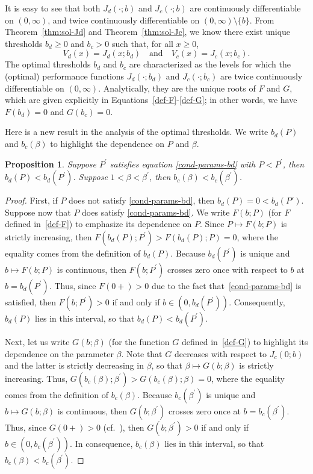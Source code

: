\documentclass[11pt,reqno]{amsart}
\newtheorem{proposition}[theorem]{Proposition}
\renewcommand{\geq}{\geqslant}
\begin{document}
It is easy to see that both $J_d(\cdot;b)$ and $J_c(\cdot;b)$ are continuously differentiable on $(0,\infty)$, and twice continuously differentiable on $(0,\infty) \setminus \{b\}$. From Theorem~\ref{thm:sol-Jd} and Theorem~\ref{thm:sol-Jc}, we know there exist unique thresholds $b_d\geq 0$ and $b_c > 0$ such that, for all $x\geq 0$,
\[
V_d(x) = J_d(x;b_d) \quad \text{and} \quad V_c(x) = J_c(x;b_c) .
\]
The optimal thresholds $b_d$ and $b_c$ are characterized as the levels for which the (optimal) performance functions $J_d (\cdot;b_d)$ and $J_c (\cdot;b_c)$ are twice continuously differentiable on $(0,\infty)$. Analytically, they are the unique roots of $F$ and $G$, which are given explicitly in Equations~\eqref{def-F}-\eqref{def-G}; in other words, we have $F(b_d) = 0$ and $G(b_c)=0$.

Here is a new result in the analysis of the optimal thresholds. We write $b_d(P)$ and $b_c(\beta)$ to highlight the dependence on $P$ and $\beta$.
\begin{proposition}\label{prop:seuils-croiss}
    Suppose  $P^\prime$ satisfies equation \eqref{cond-params-bd} with $P<P^\prime$, then $b_d(P)<b_d(P^\prime)$. Suppose $1< \beta < \beta^\prime$, then $b_c(\beta)<b_c(\beta^\prime)$.
\end{proposition}
\begin{proof}
    First, if $P$ does not satisfy \eqref{cond-params-bd}, then $b_d(P) = 0 < b_d(P')$. Suppose now that $P$ does satisfy \eqref{cond-params-bd}. We write $F(b;P)$ (for $F$ defined in~\eqref{def-F}) to emphasize its dependence on $P$. Since $P \mapsto F(b;P)$ is strictly increasing, then $F(b_d(P);P^\prime) > F(b_d(P);P) = 0$, where the equality comes from the definition of $b_d(P)$. Because $b_d(P^\prime)$ is unique and $b \mapsto F(b;P)$ is continuous, then $F(b;P^\prime)$ crosses zero once with respect to $b$ at $b = b_d(P^\prime)$. Thus, since $F(0+)>0$ due to the fact that~\eqref{cond-params-bd} is satisfied, then $F(b;P^\prime) > 0$ if and only if $b\in (0,b_d(P^\prime))$. Consequently, $b_d(P)$ lies in this interval, so that $b_d(P) < b_d(P^\prime)$.
        
    Next, let us write $G(b;\beta)$ (for the function $G$ defined in~\eqref{def-G}) to highlight its dependence on the parameter $\beta$. Note that $G$ decreases with respect to $J_c(0;b)$ and the latter is strictly decreasing in $\beta$, so that $\beta \mapsto G(b;\beta)$ is strictly increasing. Thus, $G(b_c(\beta);\beta^\prime) > G(b_c(\beta);\beta) = 0$, where the equality comes from the definition of $b_c(\beta)$. Because $b_c(\beta^\prime)$ is unique and $b \mapsto G(b;\beta)$ is continuous, then $G(b;\beta^\prime)$ crosses zero once at $b = b_c(\beta^\prime)$. Thus, since $G(0+)>0$ (cf.\ \cite{mastromonaco_2025}), then $G(b;\beta^\prime) > 0$ if and only if $b\in (0,b_c(\beta^\prime))$. In consequence, $b_c(\beta)$ lies in this interval, so that $b_c(\beta) < b_c(\beta^\prime)$.
\end{proof}
\end{document}
